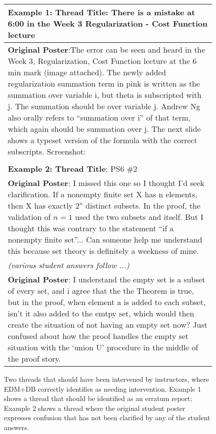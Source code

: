 \documentclass[11pt,a4paper]{article}
\begin{document}
\begin{figure}[t]
\small
\begin{tabular}{|p{7.3cm}|}
\hline
\textbf{Example 1: Thread Title}: There is a mistake at 6:00 in the Week 3 Regularization 
- Cost Function lecture \\
\hline
\textbf{Original Poster}:The error can be seen and heard in the Week 3, Regularization,
Cost Function lecture at the 6 min mark (image attached). The newly added 
regularization summation term in pink is written as the summation over variable i, 
but theta is subscripted with j. The summation should be over variable j. Andrew 
Ng also orally refers to ``summation over i'' of that term, which again should  
be summation over j. The next slide shows a typeset version of the formula with 
the correct subscripts. Screenshot: \\
\hline
\\
\hline
\textbf{Example 2: Thread Title}: PS6 \#2\\
\hline
\textbf{Original Poster}: I missed this one so I thought I'd seek clarification. If a 
nonempty finite set X has n elements, then X has exactly $2^n$ distinct subsets. In 
the proof, the validation of $n=1$ used the two subsets and itself. But I thought  
this was contrary to the statement ``if a  nonempty finite set''... Can someone help 
me understand this because set theory is definitely a weekness of mine.\\
\hline
{\it (various student answers follow ...)} \\
\hline
\textbf{Original Poster}: I understand the empty set is a subset of every set, and i agree 
that the the Theorem is true, but in the proof, when element {a} is added to each 
subset, isn't it also added to the emtpy set, which would then create the situation 
of not having an empty set now? Just confused about how the proof handles the 
empty set situation with the `union U' procedure in the middle of the proof story.\\
\hline
\end{tabular}
\caption{Two threads that should have been intervened by instructors,
  where EDM+DB correctly identifies as needing intervention. Example 1
  shows a
  thread that should be identified as an erratum report; Example 2 shows a
  thread where the original student poster expresses confusion that
  has not been clarified by any of the student answers.}
\label{fig:2examples}
\end{figure}

\end{document}
